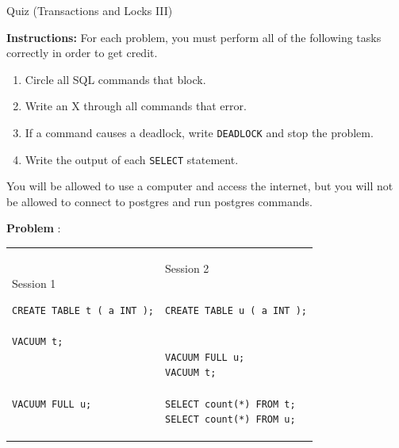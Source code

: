 \documentclass[10pt]{article}
\theoremstyle{definition}
\newcounter{ProblemCounter}
\newcommand{\nextproblem}{\filbreak\stepcounter{ProblemCounter} \noindent\textbf{Problem \theProblemCounter}:}
\begin{document}
\begin{center}
{
\Large
    Quiz (Transactions and Locks III)
}

    \vspace{0.1in}
\end{center}

\noindent
\textbf{Instructions:}
For each problem, you must perform all of the following tasks correctly in order to get credit.
\begin{enumerate}
\item Circle all SQL commands that block.
\item Write an X through all commands that error.
\item If a command causes a deadlock, write \lstinline{DEADLOCK} and stop the problem.
\item Write the output of each \lstinline{SELECT} statement.
\end{enumerate}
    You will be allowed to use a computer and access the internet, but you will not be allowed to connect to postgres and run postgres commands.

\vspace{1in}


\nextproblem
\begin{tcolorbox}
\begin{tabular}{p{3.25in}p{3in}}
\hspace{-0.2in}Session 1
\begin{lstlisting}
CREATE TABLE t ( a INT );

VACUUM t;
  


VACUUM FULL u;

\end{lstlisting}
    &
\hspace{-0.2in}Session 2
\begin{lstlisting}

CREATE TABLE u ( a INT );


VACUUM FULL u;
VACUUM t;

SELECT count(*) FROM t;
SELECT count(*) FROM u;
\end{lstlisting}
\end{tabular}
\end{tcolorbox}
\vspace{0.25in}
\end{document}

